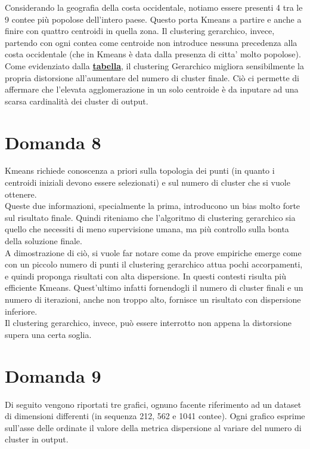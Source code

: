 \documentclass{article}
\begin{document}
Considerando la geografia della costa occidentale, notiamo essere presenti 4 tra le 9 contee più popolose dell'intero paese.
Questo porta Kmeans a partire e anche a finire con quattro centroidi in quella zona.
Il clustering gerarchico, invece, partendo con ogni contea come centroide non introduce nessuna precedenza alla costa occidentale (che in Kmeans è data dalla presenza di citta' molto popolose).\\
Come evidenziato dalla \hyperlink{fig:test}{\textbf{tabella}}, il clustering Gerarchico migliora sensibilmente la propria distorsione all'aumentare del numero di cluster finale.
Ciò ci permette di affermare che l'elevata agglomerazione in un solo centroide è da inputare ad una scarsa cardinalità dei cluster di output.


\section*{Domanda 8}
Kmeans richiede conoscenza a priori sulla topologia dei punti (in quanto i centroidi iniziali devono essere selezionati) e sul numero di cluster che si vuole ottenere.\\
Queste due informazioni, specialmente la prima, introducono un bias molto forte sul risultato finale.
Quindi riteniamo che l'algoritmo di clustering gerarchico sia quello che necessiti di meno supervisione umana, ma più controllo sulla bonta della soluzione finale.\\
A dimostrazione di ciò, si vuole far notare come da prove empiriche emerge come con un piccolo numero di punti il clustering gerarchico attua pochi accorpamenti, e quindi proponga risultati con alta dispersione. In questi contesti risulta più efficiente Kmeans. Quest'ultimo infatti fornendogli il numero di cluster finali e un numero di iterazioni, anche non troppo alto, fornisce un risultato con dispersione inferiore. \\ 
Il clustering gerarchico, invece, può essere interrotto non appena la distorsione supera una certa soglia.

\section*{Domanda 9}
Di seguito vengono riportati tre grafici, ognuno facente riferimento ad un dataset di dimensioni differenti (in sequenza 212, 562 e 1041 contee). 
Ogni grafico esprime sull'asse delle ordinate il valore della metrica dispersione al variare del numero di cluster in output.\\
\end{document}
